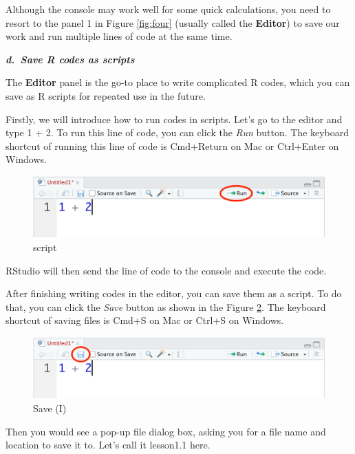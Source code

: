 \documentclass[
]{book}
\begin{document}
Although the console may work well for some quick calculations, you need to resort to the panel 1 in Figure \ref{fig:four} (usually called the \textbf{Editor}) to save our work and run multiple lines of code at the same time.

\textbf{\emph{d.~Save R codes as scripts}}

The \textbf{Editor} panel is the go-to place to write complicated R codes, which you can save as R scripts for repeated use in the future.

Firstly, we will introduce how to run codes in scripts. Let's go to the editor and type 1 + 2. To run this line of code, you can click the \emph{Run} button. The keyboard shortcut of running this line of code is Cmd+Return on Mac or Ctrl+Enter on Windows.

\begin{figure}

{\centering \includegraphics[width=0.7\linewidth]{pics/1run} 

}

\caption{script}\label{fig:run}
\end{figure}

RStudio will then send the line of code to the console and execute the code.

After finishing writing codes in the editor, you can save them as a script. To do that, you can click the \emph{Save} button as shown in the Figure \ref{fig:save1}. The keyboard shortcut of saving files is Cmd+S on Mac or Ctrl+S on Windows.

\begin{figure}

{\centering \includegraphics[width=0.7\linewidth]{pics/1save1} 

}

\caption{Save (I)}\label{fig:save1}
\end{figure}

Then you would see a pop-up file dialog box, asking you for a file name and location to save it to. Let's call it lesson1.1 here.
\end{document}
